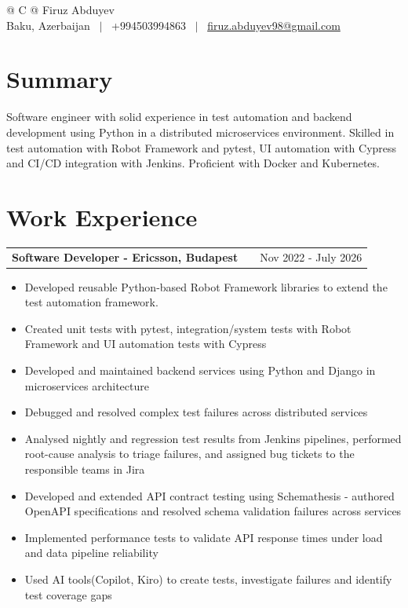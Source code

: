 \documentclass[a4paper,12pt]{article}
\makeatletter
\newenvironment{joblong}[2]
    {
    \begin{tabularx}{\linewidth}{@{}l X r@{}}
    \textbf{#1} & \hfill &  #2 \\[3.75pt]
    \end{tabularx}
    \begin{minipage}[t]{\linewidth}
    \begin{itemize}[nosep,after=\strut, leftmargin=1em, itemsep=3pt,label=--]
    }
    {
    \end{itemize}
    \end{minipage}    
    }
\makeatother
\begin{document}
\pagestyle{empty}


\begin{tabularx}{\linewidth}{@{} C @{}}
\Huge{Firuz Abduyev} \\[6pt]
Baku, Azerbaijan \ $|$ \ +994503994863 \ $|$ \ 
\href{mailto:firuz.abduyev98@gmail.com}{firuz.abduyev98@gmail.com}
\end{tabularx}


\section{Summary}
Software engineer with solid experience in test automation and backend development using Python in a distributed 
microservices environment. Skilled in test automation with Robot Framework and pytest, UI automation with Cypress and CI/CD integration with Jenkins. Proficient with Docker and Kubernetes.


\section{Work Experience}

\begin{joblong}{Software Developer - Ericsson, Budapest}{Nov 2022 - July 2026}
\item Developed reusable Python-based Robot Framework libraries to extend the test automation framework.
\item Created unit tests with pytest, integration/system tests with Robot Framework and UI automation tests with Cypress
\item Developed and maintained backend services using Python and Django in microservices architecture
\item Debugged and resolved complex test failures across distributed services
\item Analysed nightly and regression test results from Jenkins pipelines, performed root-cause analysis to triage 
failures, and assigned bug tickets to the responsible teams in Jira
\item Developed and extended API contract testing using Schemathesis - authored OpenAPI specifications and resolved schema 
validation failures across services
\item Implemented performance tests to validate API response times under load and data pipeline reliability
\item Used AI tools(Copilot, Kiro) to create tests, investigate failures and identify test coverage gaps
\end{joblong}
\end{document}
